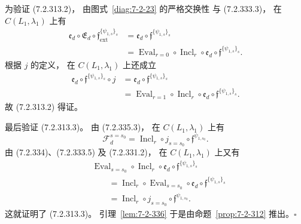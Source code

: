 为验证 (7.2.313.2)，
由图式~\ref{diag:7-2-23} 的严格交换性
与 (7.2.333.3)，
在 $C(L_1,\lambda_1)$ 上有
\[
\begin{aligned}
\mathfrak e_d\circ\mathfrak E_d
\circ\mathfrak f_{\mathrm{ext}}^{\{\psi_{1,s}\}_s}
&=\mathfrak e_d
\circ\mathfrak f^{\{\psi_{1,s}\}_s}\\
&=\operatorname{Eval}_{r=0}\circ
\operatorname{Incl}_r\circ\mathfrak e_d
\circ\mathfrak f^{\{\psi_{1,s}\}_s}.
\end{aligned}
\]
根据 $j$ 的定义，
在 $C(L_1,\lambda_1)$ 上还成立
\[
\begin{aligned}
\mathfrak e_d\circ
\mathfrak f^{\{\psi_{1,s}\}_s}\circ j
&=\mathfrak e_d\circ
\mathfrak f^{\{\psi_{1,s}\}_s}\\
&=\operatorname{Eval}_{r=1}\circ
\operatorname{Incl}_r\circ\mathfrak e_d
\circ\mathfrak f^{\{\psi_{1,s}\}_s}.
\end{aligned}
\]
故 (7.2.313.2) 得证。

最后验证 (7.2.313.3)。
由 (7.2.335.3)，
在 $C(L_1,\lambda_1)$ 上有
\[
\mathcal F_d^{s=s_0}
=\operatorname{Incl}_r\circ j_{s=s_0}
\circ\mathfrak f^{\psi_{1,s_0}}.
\]
由 (7.2.334)、(7.2.333.5)
及 (7.2.331.2)，
在 $C(L_1,\lambda_1)$ 上又有
\[
\begin{aligned}
&\operatorname{Eval}_{s=s_0}\circ
\operatorname{Incl}_r\circ\mathfrak e_d
\circ\mathfrak f^{\{\psi_{1,s}\}_s}\\
&\qquad
=\operatorname{Incl}_r\circ
\operatorname{Eval}_{s=s_0}\circ\mathfrak e_d
\circ\mathfrak f^{\{\psi_{1,s}\}_s}\\
&\qquad
=\operatorname{Incl}_r\circ j_{s=s_0}
\circ\mathfrak f^{\psi_{1,s_0}}.
\end{aligned}
\]
这就证明了 (7.2.313.3)。
引理~\ref{lem:7-2-336}
于是由命题~\ref{prop:7-2-312}
推出。\hfill$\square$
